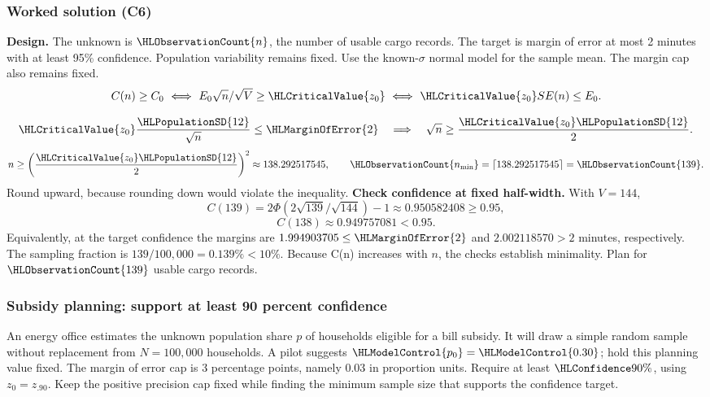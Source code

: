 \subsubsection*{Worked solution (C6)}\label{sol:t4-mean}
\textbf{Design.} The unknown is $\HLObservationCount{n}$, the number of usable cargo records. The target is margin of error at most 2 minutes with at least 95\% confidence. Population variability remains fixed. Use the known-$\sigma$ normal model for the sample mean. The margin cap also remains fixed. 
\[C(n)\ge C_0\ \Longleftrightarrow\ E_0\sqrt n/\sqrt V\ge \HLCriticalValue{z_0}\ \Longleftrightarrow\ \HLCriticalValue{z_0}SE(n)\le E_0.\]

\[
\HLCriticalValue{z_0}\frac{\HLPopulationSD{12}}{\sqrt n}\le \HLMarginOfError{2}\quad\Longrightarrow\quad\sqrt n\ge\frac{\HLCriticalValue{z_0}\HLPopulationSD{12}}{2}.
\]
\[n\ge\left(\frac{\HLCriticalValue{z_0}\HLPopulationSD{12}}{2}\right)^2\approx138.292517545,\qquad \HLObservationCount{n_{\min}}=\left\lceil 138.292517545\right\rceil=\HLObservationCount{139}.\]
Round upward, because rounding down would violate the inequality.
\textbf{Check confidence at fixed half-width.} With $V=144$,
\[
C(139)=2\Phi(2\sqrt{139}/\sqrt{144})-1\approx 0.950582408\ge 0.95,
\]
\[C(138)\approx 0.949757081<0.95.\]
Equivalently, at the target confidence the margins are $1.994903705\le \HLMarginOfError{2}$ and $2.002118570>2$ minutes, respectively. The sampling fraction is $139/100{,}000=0.139\%<10\%$. Because C(n) increases with $n$, the checks establish minimality. Plan for $\HLObservationCount{139}$ usable cargo records. 
\clearpage
\subsubsection{Subsidy planning: support at least 90 percent confidence}\label{prob:t4-prop}
An energy office estimates the unknown population share $p$ of households eligible for a bill subsidy. It will draw a simple random sample without replacement from $N=100{,}000$ households. A pilot suggests $\HLModelControl{p_0}=\HLModelControl{0.30}$; hold this planning value fixed. The margin of error cap is 3 percentage points, namely 0.03 in proportion units. Require at least $\HLConfidence{90\%}$, using $z_0=z_{.90}$. Keep the positive precision cap fixed while finding the minimum sample size that supports the confidence target. 
